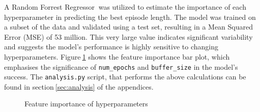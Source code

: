 A Random Forrest Regressor$~$\cite{randomforrestM} was utilized to estimate the importance of each hyperparameter in predicting the best episode length. The model was trained on a subset of the data and validated using a test set, resulting in a Mean Squared Error (MSE) of 53 million. This very large value indicates significant variability and suggests the model's performance is highly sensitive to changing hyperparameters. Figure$~$\ref{feature_importance} shows the feature importance bar plot, which emphasises the significance of \texttt{num\_epochs} and \texttt{buffer\_size} in the model's success. The \texttt{analysis.py} script, that performs the above calculations can be found in section$~$\ref{sec:analysis} of the appendices.


\begin{figure}[!htb]
    \centering
    \caption{Feature importance of hyperparameters}\label{feature_importance}
\end{figure}


